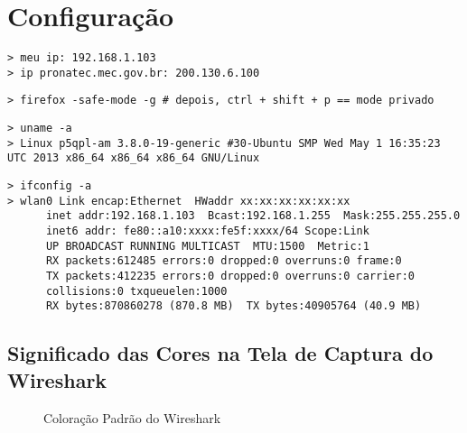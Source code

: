 \documentclass[13pt, a4paper]{article}
\begin{document}


\tableofcontents
\pagebreak

\listoffigures
\pagebreak

\pagebreak


\section{Configuração}

\begin{verbatim}
> meu ip: 192.168.1.103
> ip pronatec.mec.gov.br: 200.130.6.100
\end{verbatim}

\begin{verbatim}
> firefox -safe-mode -g # depois, ctrl + shift + p == mode privado
\end{verbatim}

\begin{verbatim}
> uname -a
> Linux p5qpl-am 3.8.0-19-generic #30-Ubuntu SMP Wed May 1 16:35:23 UTC 2013 x86_64 x86_64 x86_64 GNU/Linux
\end{verbatim}

\begin{verbatim}
> ifconfig -a
> wlan0 Link encap:Ethernet  HWaddr xx:xx:xx:xx:xx:xx
      inet addr:192.168.1.103  Bcast:192.168.1.255  Mask:255.255.255.0
      inet6 addr: fe80::a10:xxxx:fe5f:xxxx/64 Scope:Link
      UP BROADCAST RUNNING MULTICAST  MTU:1500  Metric:1
      RX packets:612485 errors:0 dropped:0 overruns:0 frame:0
      TX packets:412235 errors:0 dropped:0 overruns:0 carrier:0
      collisions:0 txqueuelen:1000
      RX bytes:870860278 (870.8 MB)  TX bytes:40905764 (40.9 MB)
\end{verbatim}

\pagebreak
\subsection{Significado das Cores na Tela de Captura do Wireshark}

\begin{figure}[ht]
\centering
\caption{Coloração Padrão do Wireshark}
\end{figure}
\end{document}

